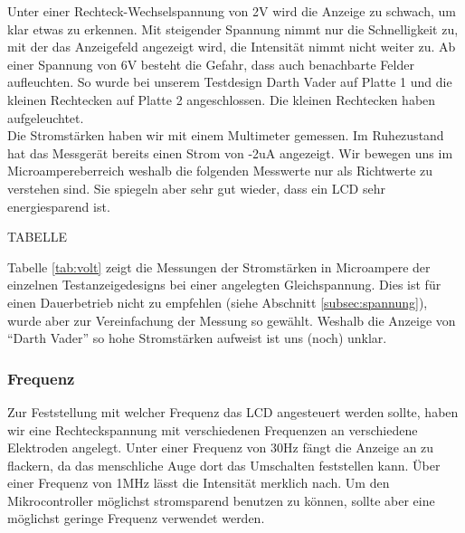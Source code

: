 Unter einer Rechteck-Wechselspannung von 2V wird die Anzeige zu schwach, um klar etwas zu erkennen. Mit steigender Spannung nimmt nur die Schnelligkeit zu, mit der das Anzeigefeld angezeigt wird, die Intensität nimmt nicht weiter zu. Ab einer Spannung von 6V besteht die Gefahr, dass auch benachbarte Felder aufleuchten. So wurde bei unserem Testdesign {\quote Darth Vader} auf Platte 1 und die {\quote kleinen Rechtecken} auf Platte 2 angeschlossen. Die kleinen Rechtecken haben aufgeleuchtet.\\
Die Stromstärken haben wir mit einem Multimeter gemessen. Im Ruhezustand hat das Messgerät bereits einen Strom von -2uA angezeigt. Wir bewegen uns im Microampereberreich weshalb die folgenden Messwerte nur als Richtwerte zu verstehen sind. Sie spiegeln aber sehr gut wieder, dass ein LCD sehr energiesparend ist.

TABELLE

Tabelle \ref{tab:volt} zeigt die Messungen der Stromstärken in Microampere der einzelnen Testanzeigedesigns bei einer angelegten Gleichspannung. Dies ist für einen Dauerbetrieb nicht zu empfehlen (siehe Abschnitt \ref{subsec:spannung}), wurde aber zur Vereinfachung der Messung so gewählt. Weshalb die Anzeige von “Darth Vader” so hohe Stromstärken aufweist ist uns (noch) unklar.

\subsubsection{Frequenz}
Zur Feststellung mit welcher Frequenz das LCD angesteuert werden sollte, haben wir eine Rechteckspannung mit verschiedenen Frequenzen an verschiedene Elektroden angelegt. Unter einer Frequenz von 30Hz fängt die Anzeige an zu flackern, da das menschliche Auge dort das Umschalten feststellen kann. Über einer Frequenz von 1MHz lässt die Intensität merklich nach. Um den Mikrocontroller möglichst stromsparend benutzen zu können, sollte aber eine möglichst geringe Frequenz verwendet werden.

